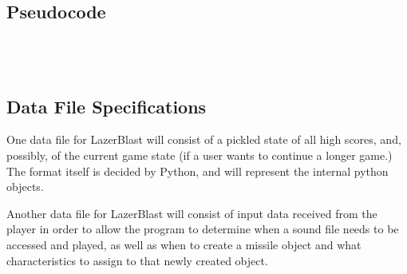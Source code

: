 \subsection*{Pseudocode}
    \inputminted{python}{../assets/base_classes.py}

    \inputminted{python}{../assets/ships.py}

    \inputminted{python}{../assets/menus.py}

    \inputminted{python}{../assets/sounds_and_projectiles.py}

\subsection*{Data File Specifications}
    One data file for LazerBlast will consist of a
    pickled state of all high scores, and, possibly,
    of the current game state (if a user wants to
    continue a longer game.)  The format itself is
    decided by Python, and will represent the internal
    python objects.

    Another data file for LazerBlast will consist of input data received
    from the player in order to allow the program to determine when
    a sound file needs to be accessed and played, as well as when to
    create a missile object and what characteristics to assign to
    that newly created object.
